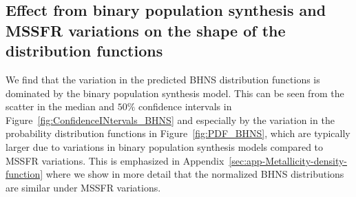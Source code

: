 \documentclass[twocolumn]{aastex63}
\newcommand\bhnsSingle{BHNS\xspace}
\begin{document}
\subsection{Effect from binary population synthesis and MSSFR variations on the shape of the distribution functions}
%


We find that the variation in the predicted \bhnsSingle distribution functions is dominated by the binary population synthesis model. This can  be seen from the scatter in the median and  $50\%$ confidence intervals in Figure~\ref{fig:ConfidenceINtervals_BHNS} and especially by the variation in the probability distribution functions in Figure~\ref{fig:PDF_BHNS}, which are typically larger due to variations in binary population synthesis models compared to  \ac{MSSFR} variations. This is emphasized in Appendix~\ref{sec:app-Metallicity-density-function} where we  show in more detail that the normalized \bhnsSingle distributions are similar  under  \ac{MSSFR} variations. 

%


%
%





%
%




\end{document}
